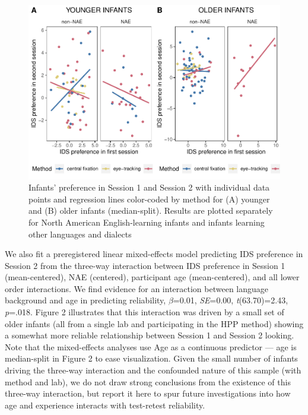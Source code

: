 \documentclass[
  man, donotrepeattitle,floatsintext]{apa6}
\begin{document}
\begin{figure}
\centering
\includegraphics{MB1T_supplement_files/figure-latex/unnamed-chunk-15-1.pdf}
\caption{\label{fig:unnamed-chunk-15}Infants' preference in Session 1 and Session 2 with individual data points and regression lines color-coded by method for (A) younger and (B) older infants (median-split). Results are plotted separately for North American English-learning infants and infants learning other languages and dialects}
\end{figure}

We also fit a preregistered linear mixed-effects model predicting IDS preference in Session 2 from the three-way interaction between IDS preference in Session 1 (mean-centered), NAE (centered), participant age (mean-centered), and all lower order interactions.
We find evidence for an interaction between language background and age in predicting reliability, \(\beta\)=0.01, \emph{SE}=0.00, \emph{t}(63.70)=2.43, \emph{p}=.018.
Figure 2 illustrates that this interaction was driven by a small set of older infants (all from a single lab and participating in the HPP method) showing a somewhat more reliable relationship between Session 1 and Session 2 looking.
Note that the mixed-effects analyses use Age as a continuous predictor --- age is median-split in Figure 2 to ease visualization.
Given the small number of infants driving the three-way interaction and the confounded nature of this sample (with method and lab), we do not draw strong conclusions from the existence of this three-way interaction, but report it here to spur future investigations into how age and experience interacts with test-retest reliability.
\end{document}
